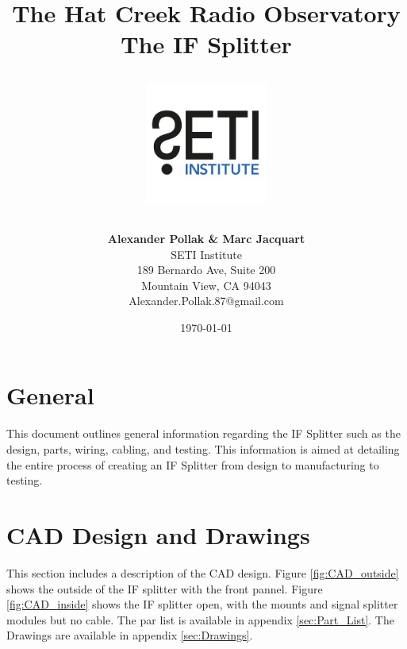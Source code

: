 \documentclass[12pt,a4paper,oneside]{article}
\title{\Huge The Hat Creek Radio Observatory\\
\vspace{0.5cm}
The IF Splitter\\
\vspace{0.5cm}
\normalsize \emph{}
\vspace{3.5cm}
\begin{center}
\includegraphics[height=4cm]{titlepage/SETI_institute_logo.jpg}
\end{center}
}
\author{ 
\vspace{1cm}
\Large
\textbf{ Alexander Pollak \& Marc Jacquart} \\
SETI Institute \\ 
189 Bernardo Ave, Suite 200 \\
Mountain View, CA 94043 \\ 
Alexander.Pollak.87@gmail.com\\
}
\date{\today}
\begin{document}
\clearpage\maketitle
\thispagestyle{empty}

%



%

\newpage

\section{General}
\label{sec:General}

This document outlines general information regarding the IF Splitter such as the design, parts, wiring, cabling, and testing. This information is aimed at detailing the entire process of creating an IF Splitter from design to manufacturing to testing. 



\section{CAD Design and Drawings}
\label{sec:CAD}
This section includes a description of the CAD design. Figure \ref{fig:CAD_outside} shows the outside of the IF splitter with the front pannel. Figure \ref{fig:CAD_inside} shows the IF splitter open, with the mounts and signal splitter modules but no cable. The par list is available in appendix \ref{sec:Part_List}. The Drawings are available in appendix \ref{sec:Drawings}.
\end{document}
